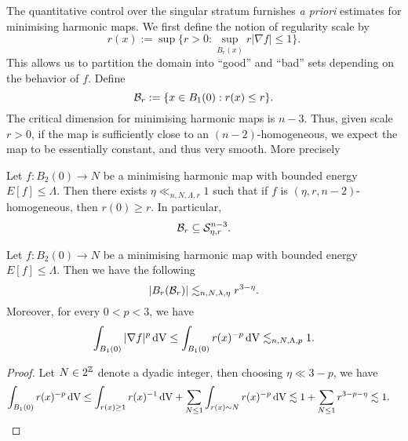 The quantitative control over the singular stratum furnishes \textit{a priori} estimates for minimising harmonic maps. We first define the notion of regularity scale by 
	\[ r (x) := \sup \{ r > 0 : \sup_{B_r (x)} r |\nabla f| \leq 1  \}. \]
This allows us to partition the domain into ``good'' and ``bad'' sets depending on the behavior of $f$. Define
	\[ \mathcal B_r := \{ x \in B_1 (0) : r(x) \leq r \}.  \]
The critical dimension for minimising harmonic maps is $n - 3$. Thus, given scale $r > 0$, if the map is sufficiently close to an $(n - 2)$-homogeneous, we expect the map to be essentially constant, and thus very smooth. More precisely 

\begin{lemma}
	Let $f: B_2 (0) \to N$ be a minimising harmonic map with bounded energy $E[f] \leq \Lambda$. Then there exists $\eta \ll_{n, N, \Lambda, r} 1$ such that if $f$ is $(\eta, r, n - 2)$-homogeneous, then $r(0) \geq r$. In particular, 
		\[ \mathcal B_r \subseteq \mathcal S^{n - 3}_{\eta, r}. \]
\end{lemma}

\begin{theorem}
	Let $f : B_2 (0) \to N$ be a minimising harmonic map with bounded energy $E[f] \leq \Lambda$. Then we have the following 
		\[ |B_r (\mathcal B_r)| \lesssim_{n, N, \lambda, \eta} r^{3 - \eta}. \]
	Moreover, for every $0 < p < 3$, we have
		\[ \int_{B_1 (0)} |\nabla f|^p \, \mathrm{dV} \leq \int_{B_1 (0)} r(x)^{-p} \, \mathrm{dV} \lesssim_{n, N, \Lambda, p} 1. \]	
\end{theorem}	

\begin{proof}
	Let $N \in 2^{\mathbb Z}$ denote a dyadic integer, then choosing $\eta \ll 3 - p$, we have
		\begin{align*}
			 \int_{B_1 (0)} r(x)^{-p} \, \mathrm{dV}
			 	&\leq \int_{r(x) \geq 1} r(x)^{-1} \, \mathrm{dV} + \sum_{N \leq 1} \int_{r(x) \sim N} r(x)^{-p} \, \mathrm{dV} \lesssim 1 + \sum_{N \leq 1} r^{3 - p - \eta} \lesssim 1. 
		\end{align*}
\end{proof}